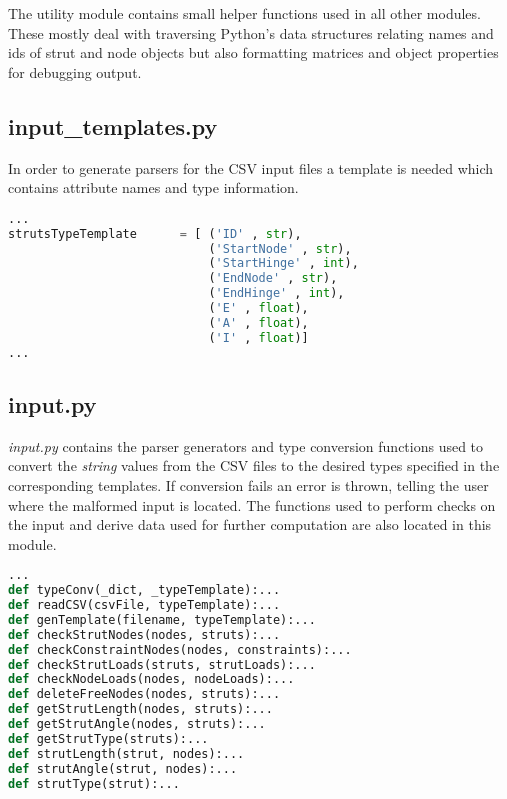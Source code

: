 The utility module contains small helper functions used in all other modules.
These mostly deal with traversing Python's data structures relating names and ids of strut and node objects but also formatting matrices and object properties for debugging output.

\pagebreak

\subsection{input\_templates.py}
\label{subsec:inputtemplates.py}

In order to generate parsers for the CSV input files a template is needed which contains attribute names and type information.

\begin{inconsolata}
\begin{minipage}{\linewidth}
\begin{lstlisting}[language=python]
...
strutsTypeTemplate      = [ ('ID' , str),
                            ('StartNode' , str),
                            ('StartHinge' , int),
                            ('EndNode' , str),
                            ('EndHinge' , int),
                            ('E' , float),
                            ('A' , float),
                            ('I' , float)]
...
\end{lstlisting}
\end{minipage}
\end{inconsolata}

\subsection{input.py}
\label{subsec:input.py}

\textit{input.py} contains the parser generators and type conversion functions used to convert the \textit{string} values from the CSV files to the desired types specified in the corresponding templates.
If conversion fails an error is thrown, telling the user where the malformed input is located.
The functions used to perform checks on the input and derive data used for further computation are also located in this module.

\begin{inconsolata}
\begin{minipage}{\linewidth}
\begin{lstlisting}[language=python]
...
def typeConv(_dict, _typeTemplate):...
def readCSV(csvFile, typeTemplate):...
def genTemplate(filename, typeTemplate):...
def checkStrutNodes(nodes, struts):...
def checkConstraintNodes(nodes, constraints):...
def checkStrutLoads(struts, strutLoads):...
def checkNodeLoads(nodes, nodeLoads):...
def deleteFreeNodes(nodes, struts):...
def getStrutLength(nodes, struts):...
def getStrutAngle(nodes, struts):...
def getStrutType(struts):...
def strutLength(strut, nodes):...
def strutAngle(strut, nodes):...
def strutType(strut):...
\end{lstlisting}
\end{minipage}
\end{inconsolata}

